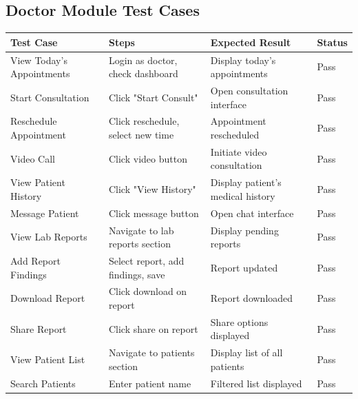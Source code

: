 \subsection{Doctor Module Test Cases}

\clearpage
\begin{table}[H]
    \centering
    \small
    \vspace{-0.5\baselineskip}
    \setlength{\tabcolsep}{2pt}
    \begin{tabular}{|p{2.5cm}|p{3.8cm}|p{2.2cm}|p{1.2cm}|}
        \hline
        \textbf{Test Case} & \textbf{Steps} & \textbf{Expected Result} & \textbf{Status} \\
        \hline
        View Today's Appointments & Login as doctor, check dashboard & Display today's appointments & Pass \\
        \hline
        Start Consultation & Click "Start Consult" & Open consultation interface & Pass \\
        \hline
        Reschedule Appointment & Click reschedule, select new time & Appointment rescheduled & Pass \\
        \hline
        Video Call & Click video button & Initiate video consultation & Pass \\
        \hline
        View Patient History & Click "View History" & Display patient's medical history & Pass \\
        \hline
        Message Patient & Click message button & Open chat interface & Pass \\
        \hline
        View Lab Reports & Navigate to lab reports section & Display pending reports & Pass \\
        \hline
        Add Report Findings & Select report, add findings, save & Report updated & Pass \\
        \hline
        Download Report & Click download on report & Report downloaded & Pass \\
        \hline
        Share Report & Click share on report & Share options displayed & Pass \\
        \hline
        View Patient List & Navigate to patients section & Display list of all patients & Pass \\
        \hline
        Search Patients & Enter patient name & Filtered list displayed & Pass \\

\end{tabular}
\end{table}

